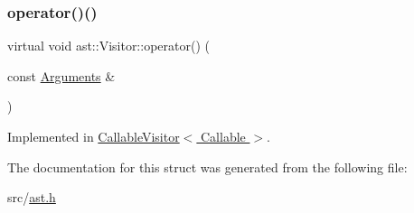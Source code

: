 \mbox{\label{structast_1_1_visitor_ae1bb70b6440910706372359ac6706283}} 
\subsubsection{\texorpdfstring{operator()()}{operator()()}\hspace{0.1cm}{\footnotesize\ttfamily [44/44]}}
{\footnotesize\ttfamily virtual void ast\+::\+Visitor\+::operator() (\begin{DoxyParamCaption}\item[{const \hyperlink{structast_1_1_arguments}{Arguments} \&}]{ }\end{DoxyParamCaption})\hspace{0.3cm}{\ttfamily [pure virtual]}}



Implemented in \hyperlink{struct_callable_visitor_aa70a97d5a44ecc30aac8fb97c12cabb6}{Callable\+Visitor$<$ Callable $>$}.



The documentation for this struct was generated from the following file\+:\begin{DoxyCompactItemize}
\item 
src/\hyperlink{ast_8h}{ast.\+h}\end{DoxyCompactItemize}
